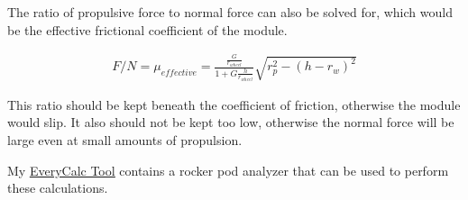\documentclass[10pt,letterpaper]{article}
\begin{document}
The ratio of propulsive force to normal force can also be solved for, which would be the effective frictional coefficient of the module.

\begin{align}
	F/N = \mu_{effective} = \frac{\frac{G}{r_{wheel}}}{ 1 + G \frac{h}{r_{wheel}} } \sqrt{r_{p}^2 - (h - r_{w})^2}
\end{align}

This ratio should be kept beneath the coefficient of friction, otherwise the module would slip. It also should not be kept too low, otherwise the normal force will be large even at small amounts of propulsion.

My \href{https://thaddeus-maximus.github.io/swissarmyengineer/rockerpod}{\color{red}\underline{EveryCalc Tool}} contains a rocker pod analyzer that can be used to perform these calculations.
	
\end{document}
